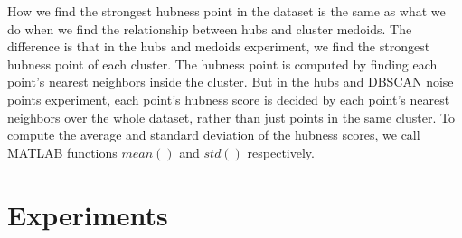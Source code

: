 \documentclass[11pt]{article}
\begin{document}
How we find the strongest hubness point in the dataset is the same as what we do when we find the relationship between hubs and cluster medoids. The difference is that in the hubs and medoids experiment, we find the strongest hubness point of each cluster. The hubness point is computed by finding each point's nearest neighbors inside the cluster. But in the hubs and DBSCAN noise points experiment, each point's hubness score is decided by each point's nearest neighbors over the whole dataset, rather than just points in the same cluster. To compute the average and standard deviation of the hubness scores, we call MATLAB functions $mean()$ and $std()$ respectively.

\section{Experiments}
\end{document}
